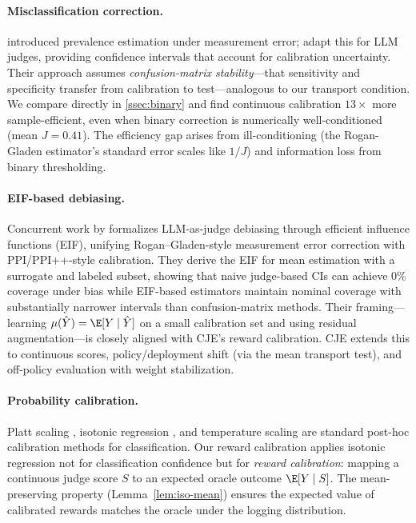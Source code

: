 \paragraph{Misclassification correction.}
\citet{RoganGladen1978} introduced prevalence estimation under measurement error; \citet{Lee2025LLMJudgeReporting} adapt this for LLM judges, providing confidence intervals that account for calibration uncertainty. Their approach assumes \emph{confusion-matrix stability}---that sensitivity and specificity transfer from calibration to test---analogous to our transport condition. We compare directly in \cref{ssec:binary} and find continuous calibration $13\times$ more sample-efficient, even when binary correction is numerically well-conditioned (mean $J = 0.41$). The efficiency gap arises from ill-conditioning (the Rogan-Gladen estimator's standard error scales like $1/J$) and information loss from binary thresholding.

\paragraph{EIF-based debiasing.}
Concurrent work by \citet{Chen2026EfficientLLMJudge} formalizes LLM-as-judge debiasing through efficient influence functions (EIF), unifying Rogan--Gladen-style measurement error correction with PPI/PPI++-style calibration. They derive the EIF for mean estimation with a surrogate and labeled subset, showing that naive judge-based CIs can achieve 0\% coverage under bias while EIF-based estimators maintain nominal coverage with substantially narrower intervals than confusion-matrix methods. Their framing---learning $\mu(\hat Y) = \E[Y \mid \hat Y]$ on a small calibration set and using residual augmentation---is closely aligned with CJE's reward calibration. CJE extends this to continuous scores, policy/deployment shift (via the mean transport test), and off-policy evaluation with weight stabilization.

\paragraph{Probability calibration.}
Platt scaling \citep{Platt1999}, isotonic regression \citep{ZadroznyElkan2002,NiculescuMizilCaruana2005}, and temperature scaling \citep{GuoPleissSunWeinberger2017Calibration} are standard post-hoc calibration methods for classification.
Our reward calibration applies isotonic regression not for classification confidence but for \emph{reward calibration}: mapping a continuous judge score $S$ to an expected oracle outcome $\E[Y \mid S]$.
The mean-preserving property (Lemma~\ref{lem:iso-mean}) ensures the expected value of calibrated rewards matches the oracle under the logging distribution.

